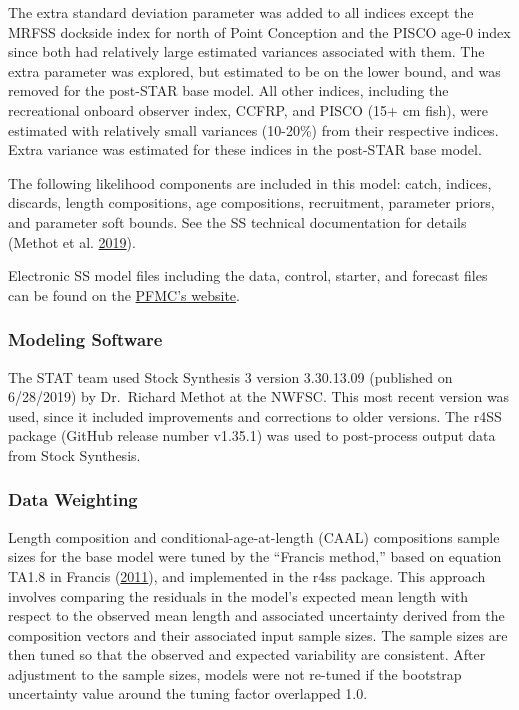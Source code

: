 \documentclass[12pt,]{article}
\begin{document}
The extra standard deviation parameter was added to all indices except
the MRFSS dockside index for north of Point Conception and the PISCO
age-0 index since both had relatively large estimated variances
associated with them. The extra parameter was explored, but estimated to
be on the lower bound, and was removed for the post-STAR base model. All
other indices, including the recreational onboard observer index, CCFRP,
and PISCO (15+ cm fish), were estimated with relatively small variances
(10-20\%) from their respective indices. Extra variance was estimated
for these indices in the post-STAR base model.

The following likelihood components are included in this model: catch,
indices, discards, length compositions, age compositions, recruitment,
parameter priors, and parameter soft bounds. See the SS technical
documentation for details (Methot et al.
\protect\hyperlink{ref-Methot2019}{2019}).

Electronic SS model files including the data, control, starter, and
forecast files can be found on the
\href{https://www.pcouncil.org/groundfish/stock-assessments/}{PFMC's
website}.

\subsubsection{Modeling Software}\label{modeling-software}

The STAT team used Stock Synthesis 3 version 3.30.13.09 (published on
6/28/2019) by Dr.~Richard Methot at the NWFSC. This most recent version
was used, since it included improvements and corrections to older
versions. The r4SS package (GitHub release number v1.35.1) was used to
post-process output data from Stock Synthesis.

\subsubsection{Data Weighting}\label{data-weighting}

Length composition and conditional-age-at-length (CAAL) compositions
sample sizes for the base model were tuned by the ``Francis method,''
based on equation TA1.8 in Francis
(\protect\hyperlink{ref-Francis2011}{2011}), and implemented in the r4ss
package. This approach involves comparing the residuals in the model's
expected mean length with respect to the observed mean length and
associated uncertainty derived from the composition vectors and their
associated input sample sizes. The sample sizes are then tuned so that
the observed and expected variability are consistent. After adjustment
to the sample sizes, models were not re-tuned if the bootstrap
uncertainty value around the tuning factor overlapped 1.0.
\end{document}
